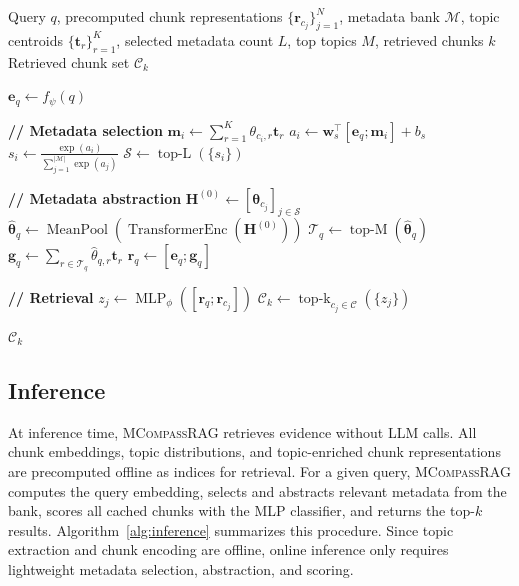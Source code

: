 \documentclass{llmxive}
\providecommand{\name}[1]{\textsc{MCompassRAG}\xspace}
\begin{document}
\begin{algorithm}[t]
\caption{\name{} Inference}
\label{alg:inference}
\begin{algorithmic}[1]
\REQUIRE Query $q$, precomputed chunk representations $\{\mathbf{r}_{c_j}\}_{j=1}^{N}$, metadata bank $\mathcal{M}$, topic centroids $\{\mathbf{t}_r\}_{r=1}^{K}$, selected metadata count $L$, top topics $M$, retrieved chunks $k$
\ENSURE Retrieved chunk set $\mathcal{C}_k$

\STATE $\mathbf{e}_q \leftarrow f_{\psi}(q)$

\STATE \textbf{// Metadata selection}
    \STATE $\mathbf{m}_i \leftarrow \sum_{r=1}^{K} \theta_{c_i,r}\mathbf{t}_r$
    \STATE $a_i \leftarrow \mathbf{w}_s^\top [\mathbf{e}_q ; \mathbf{m}_i] + b_s$
\ENDFOR
\STATE $s_i \leftarrow \frac{\exp(a_i)}{\sum_{j=1}^{|\mathcal{M}|}\exp(a_j)}$
\STATE $\mathcal{S} \leftarrow \operatorname{top\text{-}L}(\{s_i\})$

\STATE \textbf{// Metadata abstraction}
\STATE $\mathbf{H}^{(0)} \leftarrow [\boldsymbol{\theta}_{c_j}]_{j \in \mathcal{S}}$
\STATE $\hat{\boldsymbol{\theta}}_q \leftarrow \operatorname{MeanPool}(\operatorname{TransformerEnc}(\mathbf{H}^{(0)}))$
\STATE $\mathcal{T}_q \leftarrow \operatorname{top\text{-}M}(\hat{\boldsymbol{\theta}}_q)$
\STATE $\mathbf{g}_q \leftarrow \sum_{r \in \mathcal{T}_q} \hat{\theta}_{q,r}\mathbf{t}_r$
\STATE $\mathbf{r}_q \leftarrow [\mathbf{e}_q;\mathbf{g}_q]$

\STATE \textbf{// Retrieval}
    \STATE $z_j \leftarrow \operatorname{MLP}_{\phi}([\mathbf{r}_q ; \mathbf{r}_{c_j}])$
\ENDFOR
\STATE $\mathcal{C}_k \leftarrow \operatorname{top\text{-}k}_{c_j \in \mathcal{C}}(\{z_j\})$

\RETURN $\mathcal{C}_k$
\end{algorithmic}
\end{algorithm}

\subsection{Inference}
\label{sec:inference}

At inference time, \name{} retrieves evidence without LLM calls. All chunk embeddings, topic distributions, and topic-enriched chunk representations are precomputed offline as indices for retrieval. For a given query, \name{} computes the query embedding, selects and abstracts relevant metadata from the bank, scores all cached chunks with the MLP classifier, and returns the top-$k$ results. Algorithm~\ref{alg:inference} summarizes this procedure. Since topic extraction and chunk encoding are offline, online inference only requires lightweight metadata selection, abstraction, and scoring.
\end{document}
